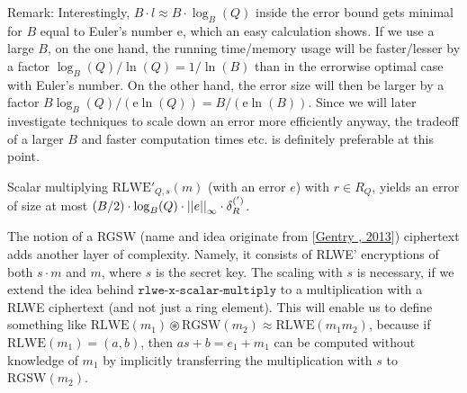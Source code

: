 \documentclass[letterpaper,10pt,english]{jupyterBook}
\begin{document}
\sphinxAtStartPar
Remark: Interestingly, \(B \cdot l \approx B \cdot \log_B(Q)\) inside the error bound gets minimal for \(B\) equal to Euler’s number \(\mathrm{e}\), which an easy calculation shows.
If we use a large \(B\), on the one hand, the running time/memory usage will be faster/lesser by a factor \(\log_B(Q)/\ln(Q) = 1/\ln(B)\) than in the error\sphinxhyphen{}wise optimal case with Euler’s number.
On the other hand, the error size will then be larger by a factor \(B\log_B(Q)/(\mathrm{e}\ln(Q)) = B/(\mathrm{e}\ln(B))\).
Since we will later investigate techniques to scale down an error more efficiently anyway, the trade\sphinxhyphen{}off of a larger \(B\) and faster computation times etc. is definitely preferable at this point.

\sphinxAtStartPar
Scalar multiplying \(\mathrm{RLWE'}_{Q,s}(m)\) (with an error \(e\)) with \(r \in R_Q\), yields an error of size at most \((B/2) \cdot \log_B(Q) \cdot \left\lvert\left\lvert e \right\rvert\right\rvert_\infty \cdot \delta_R^{(')}\).

\begin{DUlineblock}{0em}
\item[] 
\end{DUlineblock}

\sphinxAtStartPar
The notion of a RGSW (name and idea originate from {[}\hyperlink{cite.Thesis:id73}{Gentry , 2013}{]}) ciphertext adds another layer of complexity.
Namely, it consists of RLWE’ encryptions of both \(s \cdot m\) and \(m\), where \(s\) is the secret key.
The scaling with \(s\) is necessary, if we extend the idea behind \(\texttt{rlwe-x-scalar-multiply}\) to a multiplication with a RLWE ciphertext (and not just a ring element).
This will enable us to define something like \(\mathrm{RLWE}(m_1) \circledast \mathrm{RGSW}(m_2) \approx \mathrm{RLWE}(m_1m_2)\), because if \(\mathrm{RLWE}(m_1) = (a,b)\), then \(as+b = e_1 + m_1\) can be computed without knowledge of \(m_1\) by implicitly transferring the multiplication with \(s\) to \(\mathrm{RGSW}(m_2)\).
\end{document}

